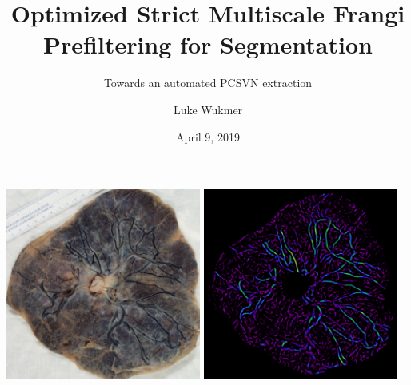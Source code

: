 \documentclass[9pt]{beamer}
\title[Cake Defense]{Optimized Strict Multiscale Frangi Prefiltering for Segmentation}
\subtitle{Towards an automated PCSVN extraction}
\author[{Luke Wukmer}] %
{{Luke Wukmer}}%
\institute[CSULB] %
{
  Advisor: Dr. Jen-Mei Chang\\
  Department of Mathematics and Statistics\\
  California State University, Long Beach\\
  \texttt{lwukmer@gmail.com}
}
\date{April 9, 2019}
\begin{document}
\begin{frame} %
  \titlepage
\end{frame}

\begin{frame}
\includegraphics[width=0.48\textwidth]{BN0651415-cropped_cimg}
\includegraphics[width=0.48\textwidth]{BN0651415-Vsigma-18-unscaled.png}
\end{frame}
\end{document}
